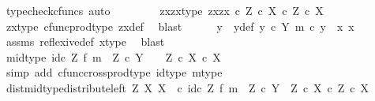 \begin{isabellebody}
\ {\isacharparenleft}{\kern0pt}typecheck{\isacharunderscore}{\kern0pt}cfuncs{\isacharcomma}{\kern0pt}\ auto{\isacharparenright}{\kern0pt}\isanewline
\ \ \isamarkupfalse%
\isanewline
\ \ \ \ \isamarkupfalse%
\ zxzx{\isacharunderscore}{\kern0pt}type{\isacharcolon}{\kern0pt}\ {\isachardoublequoteopen}{\isasymlangle}{\isasymlangle}z{\isacharcomma}{\kern0pt}x{\isasymrangle}{\isacharcomma}{\kern0pt}{\isasymlangle}z{\isacharcomma}{\kern0pt}x{\isasymrangle}{\isasymrangle}\ {\isasymin}\isactrlsub c\ {\isacharparenleft}{\kern0pt}Z\ {\isasymtimes}\isactrlsub c\ X{\isacharparenright}{\kern0pt}\ {\isasymtimes}\isactrlsub c\ Z\ {\isasymtimes}\isactrlsub c\ X{\isachardoublequoteclose}\isanewline
\ \ \ \ \ \ \isamarkupfalse%
\ zx{\isacharunderscore}{\kern0pt}type\ cfunc{\isacharunderscore}{\kern0pt}prod{\isacharunderscore}{\kern0pt}type\ zx{\isacharunderscore}{\kern0pt}def\ \isamarkupfalse%
\ blast\isanewline
\ \ \ \ \isamarkupfalse%
\ y\ \ y{\isacharunderscore}{\kern0pt}def{\isacharcolon}{\kern0pt}\ {\isachardoublequoteopen}y\ {\isasymin}\isactrlsub c\ Y{\isachardoublequoteclose}\ {\isachardoublequoteopen}m\ {\isasymcirc}\isactrlsub c\ y\ {\isacharequal}{\kern0pt}\ {\isasymlangle}x{\isacharcomma}{\kern0pt}\ x{\isasymrangle}{\isachardoublequoteclose}\isanewline
\ \ \ \ \ \ \isamarkupfalse%
\ assms\ reflexive{\isacharunderscore}{\kern0pt}def{}\ x{\isacharunderscore}{\kern0pt}type\ \isamarkupfalse%
\ blast\isanewline
\ \ \ \ \ \ \ \ \isamarkupfalse%
\ mid{\isacharunderscore}{\kern0pt}type{\isacharcolon}{\kern0pt}\ {\isachardoublequoteopen}{\isacharparenleft}{\kern0pt}id\isactrlsub c\ Z\ {\isasymtimes}\isactrlsub f\ m{\isacharparenright}{\kern0pt}\ {\isacharcolon}{\kern0pt}\ Z\ {\isasymtimes}\isactrlsub c\ Y\ {\isasymrightarrow}\ \ \ Z\ {\isasymtimes}\isactrlsub c\ {\isacharparenleft}{\kern0pt}X\ {\isasymtimes}\isactrlsub c\ X{\isacharparenright}{\kern0pt}{\isachardoublequoteclose}\isanewline
\ \ \ \ \ \ \isamarkupfalse%
\ {\isacharparenleft}{\kern0pt}simp\ add{\isacharcolon}{\kern0pt}\ cfunc{\isacharunderscore}{\kern0pt}cross{\isacharunderscore}{\kern0pt}prod{\isacharunderscore}{\kern0pt}type\ id{\isacharunderscore}{\kern0pt}type\ m{\isacharunderscore}{\kern0pt}type{\isacharparenright}{\kern0pt}\isanewline
\ \ \ \ \isamarkupfalse%
\ dist{\isacharunderscore}{\kern0pt}mid{\isacharunderscore}{\kern0pt}type{\isacharcolon}{\kern0pt}{\isachardoublequoteopen}distribute{\isacharunderscore}{\kern0pt}left\ Z\ X\ X\ \ {\isasymcirc}\isactrlsub c\ {\isacharparenleft}{\kern0pt}id\isactrlsub c\ Z\ {\isasymtimes}\isactrlsub f\ m{\isacharparenright}{\kern0pt}\ {\isacharcolon}{\kern0pt}\ Z\ {\isasymtimes}\isactrlsub c\ Y\ {\isasymrightarrow}\ {\isacharparenleft}{\kern0pt}Z\ {\isasymtimes}\isactrlsub c\ X{\isacharparenright}{\kern0pt}\ {\isasymtimes}\isactrlsub c\ Z\ {\isasymtimes}\isactrlsub c\ X{\isachardoublequoteclose}\isanewline

\end{isabellebody}
